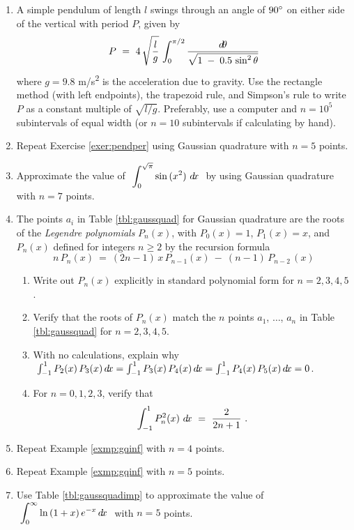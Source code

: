 {\small
{}
\begin{enumerate}[\bfseries 1.]
 \item\label{exer:pendper} A simple pendulum of length $l$ swings through an
  angle of $90^\circ$ on either side of the vertical with period $P$, given by
\[
P ~=~ 4\,\sqrt{\dfrac{l}{g}}\,\int_0^{\pi/2}
      \frac{d\!\theta}{\sqrt{1 \;-\; 0.5\,\sin^2 \theta}}
\]
where $g = 9.8$ m/s\textsuperscript{2} is the acceleration due to gravity. Use
the rectangle method (with left endpoints), the trapezoid rule, and Simpson's
rule to write $P$ as a constant multiple of $\sqrt{l/g}$. Preferably,
use a computer and $n= 10^5$ subintervals of equal width (or $n=10$ subintervals
if calculating by hand).
 \item Repeat Exercise \ref{exer:pendper} using Gaussian quadrature with $n=5$
  points.
 \item\label{exer:gqsinx2} Approximate the value of
  $~\displaystyle\int_0^{\sqrt{\pi}} \sin\,(x^2)~d\!x~$ by using Gaussian
  quadrature with $n=7$ points.
 \item The points $a_i$ in Table \ref{tbl:gaussquad} for Gaussian quadrature are
  the roots of the \emph{Legendre polynomials}
  $P_n(x)$, with $P_0(x) = 1$, $P_1(x) = x$, and $P_n(x)$ defined for integers
  $n \ge 2$ by the recursion formula
\[
n\,P_{n}(x) ~=~ (2n-1)\,x\,P_{n-1}(x) ~-~ (n-1)\,P_{n-2}\,(x)
\]
  \begin{enumerate}[\bfseries (a)]
   \item Write out $P_n(x)$ explicitly in standard polynomial form for
    $n = 2, 3, 4, 5$.
   \item Verify that the roots of $P_n(x)$ match the $n$ points $a_1$, $\ldots$,
   $a_n$ in Table \ref{tbl:gaussquad} for $n = 2, 3, 4, 5$.
   \item With no calculations, explain why 
    $~\int_{-1}^1 P_2(x)\,P_3(x)\,d\!x = \int_{-1}^1 P_3(x)\,P_4(x)\,d\!x =
    \int_{-1}^1 P_4(x)\,P_5(x)\,d\!x = 0$.
   \item For $n=0, 1, 2, 3$, verify that
\[
\int_{-1}^1 P_n^2(x)~d\!x ~=~ \frac{2}{2n+1} ~.
\]
  \end{enumerate}
 \item Repeat Example \ref{exmp:gqinf} with $n=4$ points.
 \item Repeat Example \ref{exmp:gqinf} with $n=5$ points.
 \item Use Table \ref{tbl:gaussquadimp} to approximate the value of
 $~\displaystyle\int_0^{\infty} \ln\,(1+x)\,e^{-x}\,d\!x~$ with $n=5$ points.
\end{enumerate}
}
